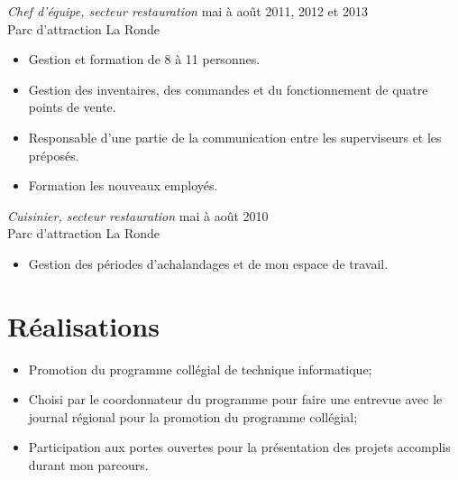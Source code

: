 \documentclass{res}
\begin{document}
\begin{resume}
{\sl Chef d'équipe, secteur restauration}
	\hfill mai à août 2011, 2012 et 2013 \\
Parc d'attraction La Ronde

\begin{itemize} \itemsep -2pt
	\item Gestion et formation de 8 à 11 personnes.
	\item Gestion des inventaires, des commandes et du fonctionnement de quatre points de vente.
	\item Responsable d’une partie de la communication entre les superviseurs et les préposés.
	\item Formation les nouveaux employés.
\end{itemize}


{\sl Cuisinier, secteur restauration}
	\hfill mai à août 2010 \\
Parc d'attraction La Ronde

\begin{itemize} \itemsep -2pt
	\item Gestion des périodes d’achalandages et de mon espace de travail.
\end{itemize}

\vspace{0.1in}


\section{Réalisations}
\vspace{12pt}

\begin{itemize} \itemsep -2pt
	\item Promotion du programme collégial de technique informatique;
	\item Choisi par le coordonnateur du programme pour faire une entrevue avec le journal régional pour la promotion du programme collégial;
	\item Participation aux portes ouvertes pour la présentation des projets accomplis durant mon parcours.
\end{itemize}

\end{resume}
\end{document}

